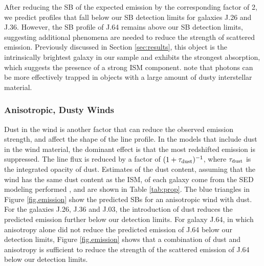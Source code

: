 \documentclass[twocolumn]{aastex61}
\begin{document}
After reducing the SB of the expected  emission by the corresponding factor of 2, we predict profiles that fall below our SB detection limits for galaxies J.26 and J.36. However, the SB profile of J.64 remains above our SB detection limits, suggesting additional phenomena are needed to reduce the strength of scattered emission. Previously discussed in Section \ref{sec:results}, this object is the intrinsically brightest galaxy in our sample and exhibits the strongest  absorption, which suggests the presence of a strong ISM component. \cite{Prochaska_2011} note that  photons can be more effectively trapped in objects with a large amount of dusty interstellar material. 

\subsubsection{Anisotropic, Dusty Winds}

Dust in the wind is another factor that can reduce the observed emission strength, and affect the shape of the line profile. 
In the \cite{Prochaska_2011} models that include dust in the wind material, the dominant effect is that the most redshifted emission is suppressed. The line flux is reduced by a factor of $(1+\tau_{\rm{dust}})^{-1}$, where $\tau_{\rm{dust}}$ is the integrated opacity of dust. Estimates of the dust content, assuming that the wind has the same dust content as the ISM, of each galaxy come from the SED modeling performed \cite{Rubin_2014}, and are shown in Table \ref{tab:prop}. The blue triangles in Figure \ref{fig.emission} show the predicted SBs for an anisotropic wind with dust. For the galaxies J.26, J.36 and J.03, the introduction of dust reduces the predicted emission further below our detection limits. For galaxy J.64, in which anisotropy alone did not reduce the predicted emission of J.64 below our detection limits, Figure \ref{fig.emission} shows that a combination of dust and anisotropy is sufficient to reduce the strength of the scattered emission of J.64 below our detection limits. 
\end{document}
